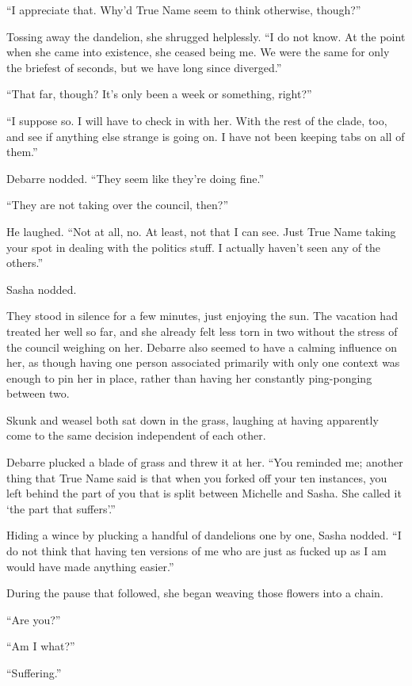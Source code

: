 ``I appreciate that. Why'd True Name seem to think otherwise, though?''

Tossing away the dandelion, she shrugged helplessly. ``I do not know. At the point when she came into existence, she ceased being me. We were the same for only the briefest of seconds, but we have long since diverged.''

``That far, though? It's only been a week or something, right?''

``I suppose so. I will have to check in with her. With the rest of the clade, too, and see if anything else strange is going on. I have not been keeping tabs on all of them.''

Debarre nodded. ``They seem like they're doing fine.''

``They are not taking over the council, then?''

He laughed. ``Not at all, no. At least, not that I can see. Just True Name taking your spot in dealing with the politics stuff. I actually haven't seen any of the others.''

Sasha nodded.

They stood in silence for a few minutes, just enjoying the sun. The vacation had treated her well so far, and she already felt less torn in two without the stress of the council weighing on her. Debarre also seemed to have a calming influence on her, as though having one person associated primarily with only one context was enough to pin her in place, rather than having her constantly ping-ponging between two.

Skunk and weasel both sat down in the grass, laughing at having apparently come to the same decision independent of each other.

Debarre plucked a blade of grass and threw it at her. ``You reminded me; another thing that True Name said is that when you forked off your ten instances, you left behind the part of you that is split between Michelle and Sasha. She called it `the part that suffers'.''

Hiding a wince by plucking a handful of dandelions one by one, Sasha nodded. ``I do not think that having ten versions of me who are just as fucked up as I am would have made anything easier.''

During the pause that followed, she began weaving those flowers into a chain.

``Are you?''

``Am I what?''

``Suffering.''

